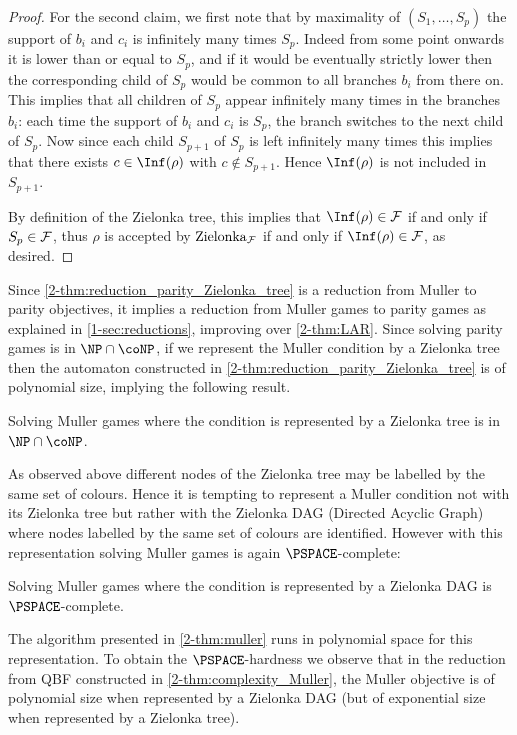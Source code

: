 \begin{proof}
For the second claim, we first note that by maximality of $(S_1,\dots,S_p)$ the support of $b_i$ and $c_i$ is infinitely many times $S_p$.
Indeed from some point onwards it is lower than or equal to $S_p$, and if it would be eventually strictly lower then the corresponding child of $S_p$ would be common to all branches $b_i$ from there on.
This implies that all children of $S_p$ appear infinitely many times in the branches $b_i$: each time the support of $b_i$ and $c_i$ is $S_p$, the branch switches to the next child of $S_p$.
Now since each child $S_{p+1}$ of $S_p$ is left infinitely many times this implies that there exists $c \in \Inf(\rho)$ with $c \notin S_{p+1}$.
Hence $\Inf(\rho)$ is not included in $S_{p+1}$.

By definition of the Zielonka tree, this implies that $\Inf(\rho) \in \F$ if and only if $S_p \in \mathcal{F}$,
thus $\rho$ is accepted by $\mathrm{Zielonka}_{\mathcal{F}}$ if and only if $\Inf(\rho) \in \F$, as desired.
\end{proof}

Since \cref{2-thm:reduction_parity_Zielonka_tree} is a reduction from Muller to parity objectives,
it implies a reduction from Muller games to parity games as explained in \cref{1-sec:reductions},
improving over \cref{2-thm:LAR}. 
Since solving parity games is in $\NP \cap \coNP$,
if we represent the Muller condition by a Zielonka tree then the automaton constructed in \cref{2-thm:reduction_parity_Zielonka_tree}
is of polynomial size, implying the following result.

\begin{theorem}
Solving Muller games where the condition is represented by a Zielonka tree is in $\NP \cap \coNP$.
\end{theorem}

As observed above different nodes of the Zielonka tree may be labelled by the same set of colours.
Hence it is tempting to represent a Muller condition not with its Zielonka tree but rather with the Zielonka DAG (Directed Acyclic Graph)
where nodes labelled by the same set of colours are identified.
However with this representation solving Muller games is again $\PSPACE$-complete:

\begin{theorem}
\label{2-thm:Muller_games_DAG}
Solving Muller games where the condition is represented by a Zielonka DAG is $\PSPACE$-complete.
\end{theorem}

The algorithm presented in \cref{2-thm:muller} runs in polynomial space for this representation.
To obtain the $\PSPACE$-hardness we observe that in the reduction from QBF constructed in \cref{2-thm:complexity_Muller},
the Muller objective is of polynomial size when represented by a Zielonka DAG (but of exponential size when represented by a Zielonka tree).

